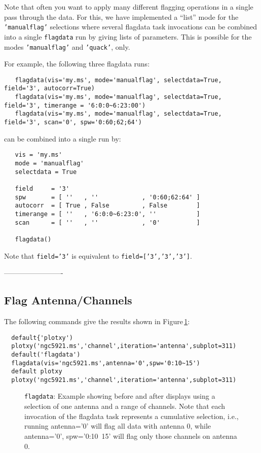 Note that often you want to apply many different flagging operations
in a single pass through the data.  For this, we have implemented
a ``list'' mode for the {\tt 'manualflag'} selections where
several flagdata task invocations can be combined into a single
{\tt flagdata} run by giving lists of parameters. 
This is possible for the modes {\tt 'manualflag'} and {\tt 'quack'}, only.
    
For example, the following three flagdata runs:
\small
\begin{verbatim}
   flagdata(vis='my.ms', mode='manualflag', selectdata=True, field='3', autocorr=True)
   flagdata(vis='my.ms', mode='manualflag', selectdata=True, field='3', timerange = '6:0:0~6:23:00')
   flagdata(vis='my.ms', mode='manualflag', selectdata=True, field='3', scan='0', spw='0:60;62;64')
\end{verbatim}
\normalsize
can be combined into a single run by:
\small
\begin{verbatim}
   vis = 'my.ms'
   mode = 'manualflag'
   selectdata = True
   
   field     = '3'
   spw       = [ ''   , ''            , '0:60;62:64' ]
   autocorr  = [ True , False         , False        ]
   timerange = [ ''   , '6:0:0~6:23:0', ''           ]
   scan      = [ ''   , ''            , '0'          ]
   
   flagdata()
\end{verbatim}
\normalsize
Note that {\tt field='3'} is equivalent to {\tt field=['3','3','3']}.

-------------------------
\subsection{Flag Antenna/Channels}
\label{section:edit.flagdata.ant}

The following commands give the results shown in 
Figure\,\ref{fig:flagdata_antchan}:
\small
\begin{verbatim}
  default{'plotxy')
  plotxy('ngc5921.ms','channel',iteration='antenna',subplot=311)
  default('flagdata')
  flagdata(vis='ngc5921.ms',antenna='0',spw='0:10~15')
  default plotxy
  plotxy('ngc5921.ms','channel',iteration='antenna',subplot=311)
\end{verbatim}
\normalsize

\begin{figure}[h!]
\begin{center}
\caption{\label{fig:flagdata_antchan} {\tt flagdata}: Example showing before
  and after displays using a selection of one antenna and a range of
  channels. Note that each invocation of the flagdata task represents
  a cumulative selection, i.e., running antenna='0' will flag all
  data with antenna 0, while antenna='0', spw='0:10~15'
  will flag only those channels on antenna 0. }
\hrulefill
\end{center}
\end{figure}


